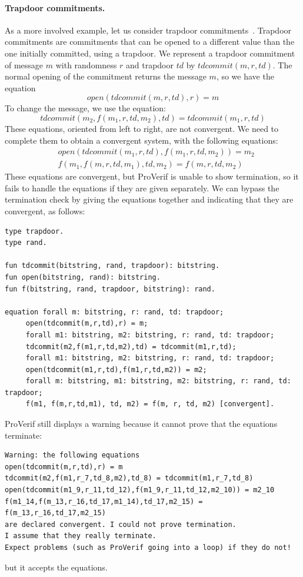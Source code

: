 \documentclass{book}
\begin{document}
\paragraph{Trapdoor commitments.}
As a more involved example, let us consider trapdoor
commitments~\cite{dreier:hal-01450916}.
Trapdoor commitments are commitments that can be opened to a different
value than the one initially committed, using a trapdoor.
We represent a trapdoor commitment of message $m$ with randomness $r$
and trapdoor $\mathit{td}$ by $\mathit{tdcommit}(m,r,\mathit{td})$.
The normal opening of the commitment returns the message $m$, so we
have the equation
\[\mathit{open}(\mathit{tdcommit}(m,r,\mathit{td}), r) = m\]
To change the message, we use the equation:
\[\mathit{tdcommit}(m_2,f(m_1,r,\mathit{td},m_2),\mathit{td}) =
\mathit{tdcommit}(m_1,r,\mathit{td})\]
These equations, oriented from left to right, are not convergent.
We need to complete them
to obtain a convergent system, with the following equations:
\begin{align*}
&\mathit{open}(\mathit{tdcommit}(m_1,r,\mathit{td}), f(m_1,r,\mathit{td},m_2)) = m_2\\
&f(m_1,f(m,r,\mathit{td},m_1),\mathit{td},m_2) = f(m,r,\mathit{td},m_2)
\end{align*}
These equations are convergent, but ProVerif is unable to show termination,
so it fails to handle the equations if they are given separately.
We can bypass the termination check by giving the equations together and
indicating that they are convergent, as follows:
\begin{lstlisting}[numbers=none]
type trapdoor.
type rand.

fun tdcommit(bitstring, rand, trapdoor): bitstring.
fun open(bitstring, rand): bitstring.
fun f(bitstring, rand, trapdoor, bitstring): rand.

equation forall m: bitstring, r: rand, td: trapdoor;
	 open(tdcommit(m,r,td),r) = m;
	 forall m1: bitstring, m2: bitstring, r: rand, td: trapdoor;
	 tdcommit(m2,f(m1,r,td,m2),td) = tdcommit(m1,r,td);
	 forall m1: bitstring, m2: bitstring, r: rand, td: trapdoor;
	 open(tdcommit(m1,r,td),f(m1,r,td,m2)) = m2;
	 forall m: bitstring, m1: bitstring, m2: bitstring, r: rand, td: trapdoor;
	 f(m1, f(m,r,td,m1), td, m2) = f(m, r, td, m2) [convergent].
\end{lstlisting}
ProVerif still displays a warning because it cannot prove that the
equations terminate:
\begin{lstlisting}[numbers=none,language=nokeyword]
Warning: the following equations
open(tdcommit(m,r,td),r) = m
tdcommit(m2,f(m1,r_7,td_8,m2),td_8) = tdcommit(m1,r_7,td_8)
open(tdcommit(m1_9,r_11,td_12),f(m1_9,r_11,td_12,m2_10)) = m2_10
f(m1_14,f(m_13,r_16,td_17,m1_14),td_17,m2_15) = f(m_13,r_16,td_17,m2_15)
are declared convergent. I could not prove termination.
I assume that they really terminate.
Expect problems (such as ProVerif going into a loop) if they do not!
\end{lstlisting}
but it accepts the equations.
\end{document}
